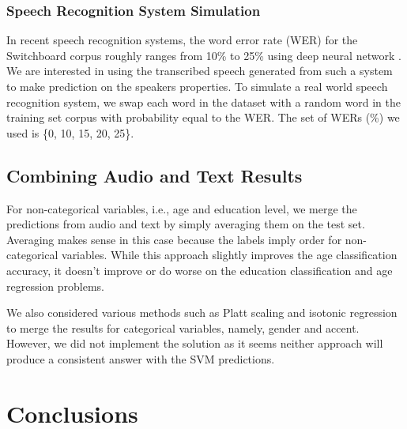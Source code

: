 \documentclass[a4paper]{article}
\begin{document}
\subsubsection{Speech Recognition System Simulation}
In recent speech recognition systems, the word error rate (WER) for the Switchboard corpus roughly ranges from 10\% to 25\% using deep neural network \cite{maas}. We are interested in using the transcribed speech generated from such a system to make prediction on the speakers properties. To simulate a real world speech recognition system, we swap each word in the dataset with a random word in the training set corpus with probability equal to the WER. The set of WERs (\%) we used is \{0, 10, 15, 20, 25\}.


\subsection{Combining Audio and Text Results}
For non-categorical variables, i.e., age and education level, we merge the predictions from audio and text by simply averaging them on the test set. Averaging makes sense in this case because the labels imply order for non-categorical variables. While this approach slightly improves the age classification accuracy, it doesn't improve or do worse on the education classification and age regression problems.

We also considered various methods such as Platt scaling \cite{platt} and isotonic regression to merge the results for categorical variables, namely, gender and accent. However, we did not implement the solution as it seems neither approach will produce a consistent answer with the SVM predictions. 

\section{Conclusions}
\end{document}

